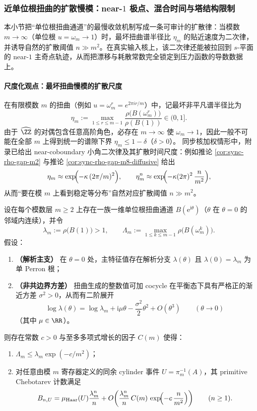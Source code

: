 \subsubsection{近单位根扭曲的扩散慢模：near-\texorpdfstring{$1$}{1} 极点、混合时间与塔结构限制}\label{subsec:xi-near1-diffusive}
本小节把“单位根扭曲通道”的最慢收敛机制写成一条可审计的扩散律：当模数 \(m\to\infty\)（单位根 \(u=\omega_m\to 1\)）时，最坏扭曲谱半径比 \(\eta_m\) 的贴近速度为二次律，并诱导自然的扩散阈值 \(n\gg m^2\)。在真实输入核上，该二次律还能被拉回到 \(s\)-平面的 near-\(1\) 主奇点轨迹，从而把漂移与耗散常数完全锁定到压力函数的导数数据上。

\paragraph{尺度化观点：最坏扭曲慢模的扩散尺度}
在有限模数 \(m\) 的扭曲（例如 \(u=\omega_m^r=e^{2\pi ir/m}\)）中，记最坏非平凡谱半径比为
\[
\eta_m:=\max_{1\le r\le m-1}\frac{\rho\bigl(B(\omega_m^r)\bigr)}{\rho(B(1))}\in(0,1].
\]
由于 \(\widehat{\ZZ}\) 的对偶包含任意高阶角色，必存在 \(m\to\infty\) 使 \(\omega_m\to 1\)，因此一般不可能在全部 \(m\) 上得到统一的谱隙下界 \(\eta_m\le 1-\delta\)（\(\delta>0\)）。
同步核加权情形中，附录已给出 near-coboundary 小角二次律及其扩散时间尺度：例如推论 \ref{cor:sync-rho-gap-m2} 与推论 \ref{cor:sync-rho-gap-m8-diffusive} 给出
\[
\eta_m\approx \exp\!\Bigl(-\kappa\,(2\pi/m)^2\Bigr),
\qquad
\eta_m^n\approx \exp\!\Bigl(-\kappa(2\pi)^2\,\frac{n}{m^2}\Bigr),
\]
从而“要在模 \(m\) 上看到稳定等分布”自然对应扩散阈值 \(n\gg m^2\)。

\begin{theorem}\label{thm:xi-abelian-diffusive-chebotarev-sufficient}
设在每个模数层 \(m\ge 2\) 上存在一族一维单位根扭曲通道 \(B(\mathrm{e}^{\mathrm{i}\theta})\)（\(\theta\) 在 \(\theta=0\) 的邻域内连续），并令
\[
\lambda_m:=\rho\bigl(B(1)\bigr)>1,
\qquad
\Lambda_m:=\max_{1\le k\le m-1}\rho\bigl(B(\omega_m^k)\bigr).
\]
假设：
\begin{enumerate}
  \item \textbf{（解析主支）} 在 \(\theta=0\) 处，主特征值存在解析分支 \(\lambda(\theta)\) 且 \(\lambda(0)=\lambda_m\) 为单 Perron 根；
  \item \textbf{（非共边界方差）} 扭曲生成的整数值可加 cocycle 在平衡态下具有严格正的渐近方差 \(\sigma^2>0\)，从而有二阶展开
  \[
  \log \lambda(\theta)=\log\lambda_m+\mathrm{i}\mu\theta-\frac{\sigma^2}{2}\theta^2+O(\theta^3)\qquad(\theta\to 0)
  \]
  （其中 \(\mu\in\RR\)）。
\end{enumerate}
则存在常数 \(c>0\) 与至多多项式增长的因子 \(C(m)\) 使得：
\begin{enumerate}
  \item \(\Lambda_m\le \lambda_m\exp(-c/m^2)\)；
  \item 对任意由模 \(m\) 寄存器定义的同余 cylinder 事件 \(U=\pi_m^{-1}(A)\)，其 primitive Chebotarev 计数满足
  \[
  B_{n,U}
  =\mu_{\mathrm{Haar}}(U)\frac{\lambda_m^n}{n}
  +O\!\left(\frac{\lambda_m^n}{n}\,C(m)\,\exp\!\Bigl(-c\,\frac{n}{m^2}\Bigr)\right)
  \qquad(n\ge 1).
  \]
\end{enumerate}
\end{theorem}

